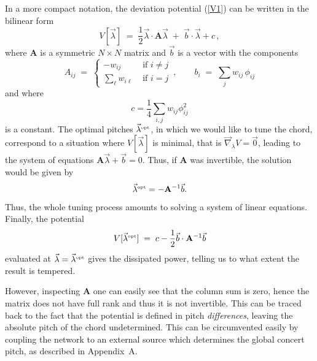 In a more compact notation, the deviation potential (\ref{V1}) can be written in the bilinear form
%
\begin{equation}
\label{GeneralV}
V[\vec\lambda] \;=\; \frac12 \vec\lambda\cdot \mathbf{A} \vec\lambda \;+\; \vec b\cdot \vec\lambda + c\,,
\end{equation}
%
where $\mathbf{A}$ is a symmetric $N\times N$ matrix and $\vec b$ is a vector with the components
\begin{equation}
\label{AB}
A_{ij} \;=\; \left\{
\begin{array}{cc}
-w_{ij} & \mbox{ if } i\neq j  \\
\sum_{\ell} w_{i\ell} & \mbox{ if } i=j 
\end{array}
\right.\,,\qquad
b_i \;=\; \sum_j w_{ij} \,\phi_{ij}
\end{equation}
%
and where
%
\begin{equation}
\label{C}
c=\frac14 \sum_{i,j} w_{ij} \phi_{ij}^2
\end{equation}
%
is a constant. The optimal pitches $\vec\lambda^{\rm\scriptscriptstyle opt}$, in which we would like to tune the chord, correspond to a situation where $V[\vec\lambda]$ is minimal, that is $\vec\nabla_\lambda V=\vec 0$, leading to the system of equations $\mathbf{A}\vec\lambda +\vec b=0$. Thus, if $\mathbf{A}$ was invertible, the solution would be given by
%
\begin{equation}
\vec\lambda^{\rm\scriptscriptstyle opt}=-\mathbf{A}^{-1}\vec b.
\end{equation}
%
Thus, the whole tuning process amounts to solving a system of linear equations. Finally, the potential 
%
\begin{equation}
\label{eqv}
V[\vec\lambda^{\rm\scriptscriptstyle opt}] \;=\; c-\frac12 \vec b \cdot \mathbf{A}^{-1}\vec b
\end{equation}
%
evaluated at $\vec\lambda=\vec\lambda^{\rm\scriptscriptstyle opt}$ gives the dissipated power, telling us to what extent the result is tempered.

However, inspecting $\mathbf A$ one can easily see that the column sum is zero, hence the matrix does not have full rank and thus it is not invertible. This can be traced back to the fact that the potential is defined in pitch \textit{differences}, leaving the absolute pitch of the chord undetermined. This can be circumvented easily by coupling the network to an external source which determines the global concert pitch, as described in Appendix~A.

